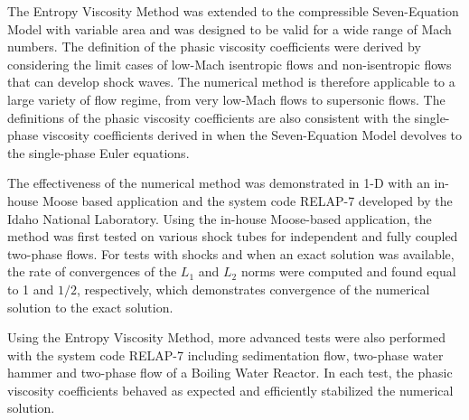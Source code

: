 \documentclass[preprint,10pt]{elsarticle}
\begin{document}
%
%
The Entropy Viscosity Method was extended to the compressible Seven-Equation Model with variable area and was designed to be valid for a 
wide range of Mach numbers. The definition of the phasic viscosity coefficients were derived by considering the limit cases of low-Mach isentropic flows and non-isentropic flows that can develop shock waves. The numerical method is therefore applicable to a large variety of flow regime, from very low-Mach flows to supersonic flows. The definitions of the phasic viscosity coefficients are also consistent with the single-phase viscosity coefficients derived in \cite{DelchiniCompFluid2014-euler} when the Seven-Equation Model devolves to the single-phase Euler equations.

The effectiveness of the numerical method was demonstrated in 1-D with an in-house Moose based application and the system code RELAP-7 developed by the Idaho National Laboratory. Using the in-house Moose-based application, the method was first tested on various shock tubes for independent and fully coupled two-phase flows. For tests with shocks and when an exact solution was available, the rate of convergences of the $L_1$ and $L_2$ norms were computed and found equal to 1 and $1/2$, respectively, which demonstrates convergence of the numerical solution to the exact solution.

Using the Entropy Viscosity Method, more advanced tests were also performed with the system code RELAP-7 including sedimentation flow, two-phase water hammer and two-phase flow of a Boiling Water Reactor. In each test, the phasic viscosity coefficients behaved as expected and efficiently stabilized the numerical solution. 
\end{document}
